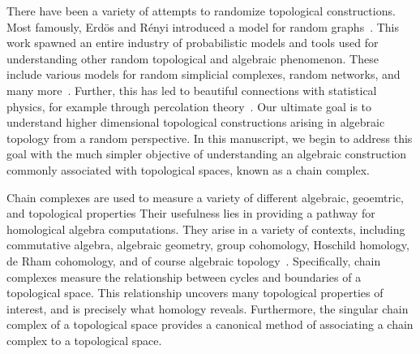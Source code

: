 There have been a variety of attempts to randomize topological constructions.
Most famously, Erd\"os and R\'enyi introduced a model for random
graphs~\cite{erdos_random_1959}.  This work spawned an
entire industry of probabilistic models and tools used for understanding other
random topological and algebraic phenomenon. These include various models for
random simplicial complexes, random networks, and many
more~\cite{erdos_evolution_1960, linial_random_2017}. Further, this has
led to beautiful connections with statistical physics, for example through
percolation theory~\cite{bollobas_2006_percolation, broadbent_percolation_1957,
kesten_percolation_1982}.  Our ultimate goal is to understand higher
dimensional topological constructions arising in algebraic topology from a
random perspective. In this manuscript, we begin to address this goal with the
much simpler objective of understanding an algebraic construction commonly associated
with topological spaces, known as a chain complex. 

Chain complexes are used to measure a
variety of different algebraic, geoemtric, and topological properties Their usefulness lies in
providing a pathway for homological algebra computations. They arise in a
variety of contexts, including commutative algebra, algebraic geometry, group
cohomology, Hoschild homology, de Rham cohomology, and of course algebraic
topology~\cite{bott2013differential, brown2012cohomology,
hartshorne2013algebraic, hatcher2002algebraic, hochschild1945cohomology}.
Specifically, chain complexes measure the relationship between cycles and
boundaries of a topological space. This relationship uncovers many topological
properties of interest, and is precisely what homology reveals. Furthermore,
the singular chain complex of a topological space provides a canonical method
of associating a chain complex to a topological space.


%


